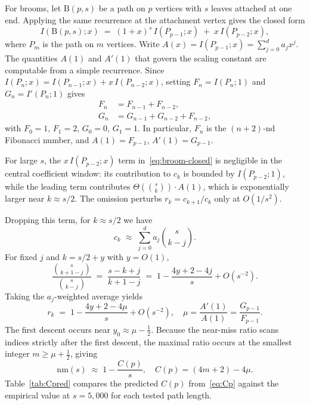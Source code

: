 \documentclass[12pt,oneside]{article}
\theoremstyle{remark}
\newcommand{\nm}{\mathrm{nm}}             %
\newcommand{\broom}{\mathrm{B}}           %
\begin{document}
For brooms, let $\broom(p, s)$ be a path on $p$ vertices with $s$ leaves attached at one end.
Applying the same recurrence at the attachment vertex gives the closed form
\begin{equation}\label{eq:broom-closed}
  I(\broom(p, s); x) \;=\; (1+x)^s\, I(P_{p-1}; x) \;+\; x\, I(P_{p-2}; x),
\end{equation}
where $P_m$ is the path on $m$ vertices.
Write $A(x) = I(P_{p-1}; x) = \sum_{j=0}^{d} a_j x^j$.
The quantities $A(1)$ and $A'(1)$ that govern the scaling constant are computable from a simple recurrence.
Since $I(P_n; x) = I(P_{n-1}; x) + x\, I(P_{n-2}; x)$, setting $F_n = I(P_n; 1)$ and $G_n = I'(P_n; 1)$ gives
\begin{align}
  F_n &= F_{n-1} + F_{n-2}, \label{eq:Fn}\\
  G_n &= G_{n-1} + G_{n-2} + F_{n-2}, \label{eq:Gn}
\end{align}
with $F_0 = 1$, $F_1 = 2$, $G_0 = 0$, $G_1 = 1$.
In particular, $F_n$ is the $(n+2)$-nd Fibonacci number, and $A(1) = F_{p-1}$, $A'(1) = G_{p-1}$.

For large $s$, the $x\, I(P_{p-2}; x)$ term in~\eqref{eq:broom-closed} is negligible in the central coefficient window: its contribution to $c_k$ is bounded by $I(P_{p-2}; 1)$, while the leading term contributes $\Theta(\binom{s}{k}) \cdot A(1)$, which is exponentially larger near $k \approx s/2$.
The omission perturbs $r_k = c_{k+1}/c_k$ only at $O(1/s^2)$.

Dropping this term, for $k \approx s/2$ we have
\[
  c_k \;\approx\; \sum_{j=0}^{d} a_j \binom{s}{k-j}.
\]
For fixed $j$ and $k = s/2 + y$ with $y = O(1)$,
\[
  \frac{\binom{s}{k+1-j}}{\binom{s}{k-j}}
  \;=\; \frac{s-k+j}{k+1-j}
  \;=\; 1 - \frac{4y + 2 - 4j}{s} + O(s^{-2}).
\]
Taking the $a_j$-weighted average yields
\[
  r_k \;=\; 1 - \frac{4y + 2 - 4\mu}{s} + O(s^{-2}),
  \quad \mu = \frac{A'(1)}{A(1)} = \frac{G_{p-1}}{F_{p-1}}.
\]
The first descent occurs near $y_0 \approx \mu - \tfrac{1}{2}$.
Because the near-miss ratio scans indices strictly after the first descent, the
maximal ratio occurs at the smallest integer $m \ge \mu + \tfrac{1}{2}$, giving
\begin{equation}\label{eq:Cp}
  \nm(s) \;\approx\; 1 - \frac{C(p)}{s}, \quad
  C(p) = (4m + 2) - 4\mu.
\end{equation}
Table~\ref{tab:Cpred} compares the predicted $C(p)$ from~\eqref{eq:Cp} against the empirical value at $s = 5{,}000$ for each tested path length.
\end{document}
